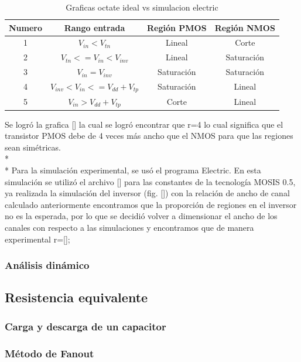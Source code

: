 \documentclass[12pt,a4paper]{article} %
\begin{document}
\begin{table}\label{table:Tabla_polarizacion}
\begin{center}
\begin{tabular}{c||c||c||c}
Numero & Rango entrada & Región PMOS & Región NMOS\\
\hline
\hline
1 & $V_{in}<V_{tn}$ & Lineal & Corte \\
2 & $V_{tn}<=V_{in}<V_{inv}$ & Lineal & Saturación \\
3 & $V_{in}=V_{inv}$ & Saturación & Saturación\\
4 & $V_{inv}<V_{in}<=V_{dd}+V_{tp}$ & Saturación & Lineal\\
5 & $V_{in}>V_{dd}+V_{tp}$ & Corte & Lineal\\
\hline
\end{tabular}
\caption{Graficas octate ideal vs simulacion electric}
\end{center}
\end{table}

Se logró la grafica [] la cual se logró encontrar que r=4 lo cual significa que el transistor PMOS debe de 4 veces más ancho que el NMOS para que las regiones sean simétricas.\\*
\\*
Para la simulación experimental, se usó el programa Electric. En esta simulación se utilizó el archivo [] para las constantes de la tecnología MOSIS 0.5, ya realizada la simulación del inversor (fig. []) con la relación de ancho de canal calculado anteriormente encontramos que la proporción de regiones en el inversor no es la esperada, por lo que se decidió volver a dimensionar el ancho de los canales con respecto a las simulaciones y encontramos que de manera experimental r=[]; 


\subsubsection{Análisis dinámico}



\subsection{Resistencia equivalente}

\subsubsection{Carga y descarga de un capacitor}


\subsubsection{Método de Fanout}
\end{document}
